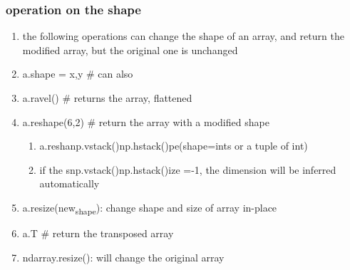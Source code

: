 \documentclass[11pt]{article}
\begin{document}
\subsubsection{operation on the shape}
\label{sec:org7cc0e44}
\begin{enumerate}
\item the following operations can change the shape of an array, and return the modified array, but the original one is unchanged
\label{sec:org8f263e9}
\item a.shape = x,y \# can also
\label{sec:org51a6426}
\item a.ravel()  \# returns the array, flattened
\label{sec:orge5f1e30}
\item a.reshape(6,2) \# return the array with a modified shape
\label{sec:org3686c00}
\begin{enumerate}
\item a.reshanp.vstack()np.hstack()pe(shape=ints or a tuple of int)
\label{sec:org0d32535}
\item if the snp.vstack()np.hstack()ize =-1, the dimension will be inferred automatically
\label{sec:orgaf8b91d}
\end{enumerate}
\item a.resize(new\textsubscript{shape}): change shape and size of array in-place
\label{sec:org8a09187}
\item a.T \# return the transposed array
\label{sec:orgb4b286c}
\item ndarray.resize(): will change the original array
\label{sec:org1b7cc11}
\end{enumerate}
\end{document}
